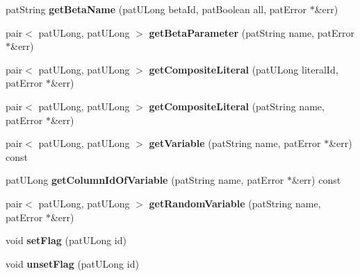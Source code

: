 \begin{DoxyCompactItemize}
pat\+String {\bfseries get\+Beta\+Name} (pat\+U\+Long beta\+Id, pat\+Boolean all, pat\+Error $\ast$\&err)
\item 
\mbox{\label{classbio_literal_repository_a21dff09d37c5c4440f2e97aa0272013b}} 
pair$<$ pat\+U\+Long, pat\+U\+Long $>$ {\bfseries get\+Beta\+Parameter} (pat\+String name, pat\+Error $\ast$\&err)
\item 
\mbox{\label{classbio_literal_repository_a12afa7178de84efcafd231c1cba9624a}} 
pair$<$ pat\+U\+Long, pat\+U\+Long $>$ {\bfseries get\+Composite\+Literal} (pat\+U\+Long literal\+Id, pat\+Error $\ast$\&err)
\item 
\mbox{\label{classbio_literal_repository_afa72c1ea8afa9032674f940927c27b78}} 
pair$<$ pat\+U\+Long, pat\+U\+Long $>$ {\bfseries get\+Composite\+Literal} (pat\+String name, pat\+Error $\ast$\&err)
\item 
\mbox{\label{classbio_literal_repository_a3167429bc72ece1b87b25022f799675e}} 
pair$<$ pat\+U\+Long, pat\+U\+Long $>$ {\bfseries get\+Variable} (pat\+String name, pat\+Error $\ast$\&err) const
\item 
\mbox{\label{classbio_literal_repository_a8d7fc80eb847728722939e60f7eef745}} 
pat\+U\+Long {\bfseries get\+Column\+Id\+Of\+Variable} (pat\+String name, pat\+Error $\ast$\&err) const
\item 
\mbox{\label{classbio_literal_repository_a23cca75b85212f32ba96c5bd40b374f4}} 
pair$<$ pat\+U\+Long, pat\+U\+Long $>$ {\bfseries get\+Random\+Variable} (pat\+String name, pat\+Error $\ast$\&err)
\item 
\mbox{\label{classbio_literal_repository_a9480f271b52315d339f89bedcad8f373}} 
void {\bfseries set\+Flag} (pat\+U\+Long id)
\item 
\mbox{\label{classbio_literal_repository_a1f6730a89051a1bfcd994c9a76e92f4f}} 
void {\bfseries unset\+Flag} (pat\+U\+Long id)
\item 
\mbox{\label{classbio_literal_repository_a6502679a9d3c9bf6a15baf699bf5f2b3}} 

\end{DoxyCompactItemize}

